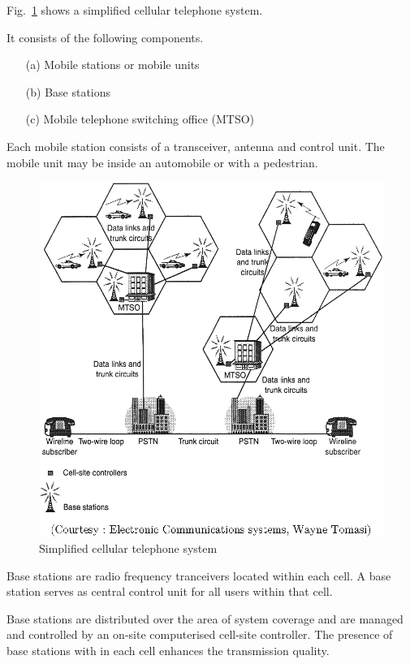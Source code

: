Fig.~\ref{fig10.4} shows a simplified cellular telephone system.

It consists of the following components.
\begin{itemize}
\item[(a)] Mobile stations or mobile units

\item[(b)] Base stations

\item[(c)] Mobile telephone switching office (MTSO)
\end{itemize}

Each mobile station consists of a transceiver, antenna and control unit. The mobile unit may be inside an automobile or with a pedestrian.
\begin{figure}[H]
\centering
\includegraphics[scale=.92]{chap10/fig10.4.eps}
\caption{Simplified cellular telephone system}\label{fig10.4}
\end{figure}

Base stations are radio frequency tranceivers located within each cell. A base station serves as central control unit for all users within that cell.

Base stations are distributed over the area of system coverage and are managed and controlled by an on-site computerised cell-site controller. The presence of base stations with in each cell enhances the transmission quality.

